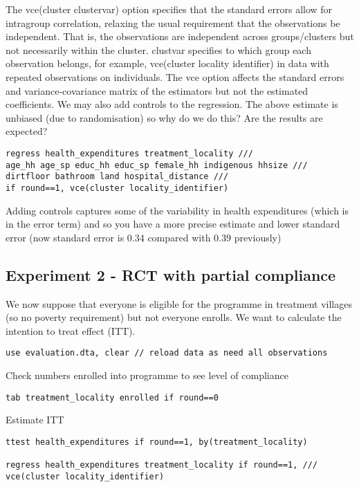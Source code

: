 \documentclass[12pt]{article}
\begin{document}
The vce(cluster clustervar) option specifies that the standard errors allow for intragroup correlation, relaxing the usual requirement that the observations be independent. That is, the observations are independent across groups/clusters but not necessarily within the cluster. clustvar specifies to which group each observation belongs, for example, vce(cluster locality identifier) in data with repeated observations on individuals. The vce option affects the standard errors and variance-covariance matrix of the estimators but not the estimated coefficients.
We may also add controls to the regression. The above estimate is unbiased (due to randomisation) so why do we do this? Are the results are expected? 


\begin{verbatim}
regress health_expenditures treatment_locality ///
age_hh age_sp educ_hh educ_sp female_hh indigenous hhsize ///
dirtfloor bathroom land hospital_distance ///
if round==1, vce(cluster locality_identifier)
\end{verbatim}

Adding controls captures some of the variability in health expenditures (which is in the error term) and so you have a more precise estimate and lower standard error (now standard error is 0.34 compared with 0.39 previously)

\subsection{Experiment 2 - RCT with partial compliance}



 We now suppose that everyone is eligible for the programme in treatment villages (so no poverty requirement) but not everyone enrolls. We want to calculate the intention to treat effect (ITT). 

\begin{verbatim}
use evaluation.dta, clear // reload data as need all observations
\end{verbatim}

 Check numbers enrolled into programme to see level of compliance 
\begin{verbatim}
tab treatment_locality enrolled if round==0
\end{verbatim}

Estimate ITT
 
\begin{verbatim}
ttest health_expenditures if round==1, by(treatment_locality)

regress health_expenditures treatment_locality if round==1, ///
vce(cluster locality_identifier)
\end{verbatim}
\end{document}
